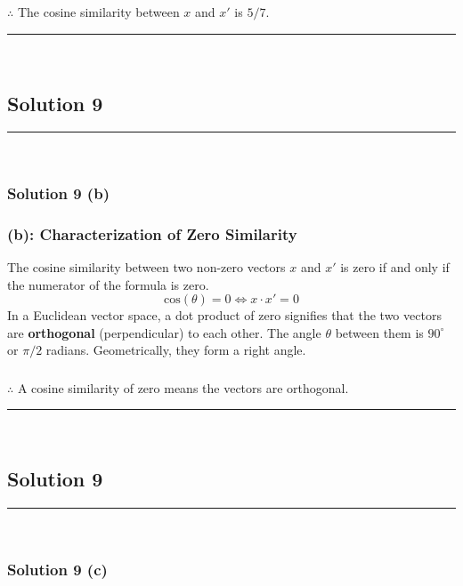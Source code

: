 \documentclass{article}
\begin{document}
\subsubsection*{\normalfont}{$\therefore$ The cosine similarity between $x$ and $x'$ is $5/7$.}


\noindent\rule{\textwidth}{0.4pt}\\

\newpage

\subsection*{Solution 9}
\noindent\rule{\textwidth}{0.4pt}\\
\subsubsection*{Solution 9 (b)}
\subsubsection*{(b): Characterization of Zero Similarity}
\parbox{\textwidth}{
The cosine similarity between two non-zero vectors $x$ and $x'$ is zero if and only if the numerator of the formula is zero.
$$ \text{cos}(\theta) = 0 \iff x \cdot x' = 0 $$
In a Euclidean vector space, a dot product of zero signifies that the two vectors are \textbf{orthogonal} (perpendicular) to each other. The angle $\theta$ between them is $90^\circ$ or $\pi/2$ radians. Geometrically, they form a right angle.
}
\subsubsection*{\normalfont}{$\therefore$ A cosine similarity of zero means the vectors are orthogonal.}

\noindent\rule{\textwidth}{0.4pt}\\

\newpage

\subsection*{Solution 9}
\noindent\rule{\textwidth}{0.4pt}\\
\subsubsection*{Solution 9 (c)}
\end{document}
